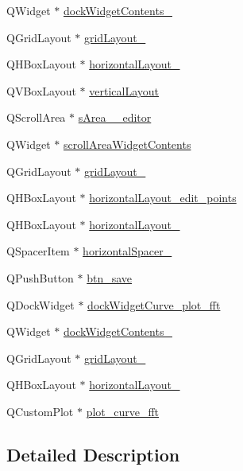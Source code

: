 \begin{DoxyCompactItemize}
\item 
Q\+Widget $\ast$ \hyperlink{a00026_a20ad5110f0fb7b329d067d354f8c9409}{dock\+Widget\+Contents\+\_}
\item 
Q\+Grid\+Layout $\ast$ \hyperlink{a00026_ac56612bd2595405ccbdfe4aae45eccd7}{grid\+Layout\+\_}
\item 
Q\+H\+Box\+Layout $\ast$ \hyperlink{a00026_a42671894c25bd8dfcc6c0a1f8689ecb8}{horizontal\+Layout\+\_}
\item 
Q\+V\+Box\+Layout $\ast$ \hyperlink{a00026_a11b9c1ae90724f0bcd67c76045c93704}{vertical\+Layout}
\item 
Q\+Scroll\+Area $\ast$ \hyperlink{a00026_a6f79b6b1fe81457d76b076a543ee4089}{s\+Area\+\_\+\+\_\+editor}
\item 
Q\+Widget $\ast$ \hyperlink{a00026_a2fd25ae1a2b71980cbe9b9ba2751da3b}{scroll\+Area\+Widget\+Contents}
\item 
Q\+Grid\+Layout $\ast$ \hyperlink{a00026_a8e397832e536976b6717e1d509226b8d}{grid\+Layout\+\_}
\item 
Q\+H\+Box\+Layout $\ast$ \hyperlink{a00026_ae08b661288ecee049945e4a63d0c0af0}{horizontal\+Layout\+\_\+edit\+\_\+points}
\item 
Q\+H\+Box\+Layout $\ast$ \hyperlink{a00026_ade915b192b206af66ce1fb317087ffb6}{horizontal\+Layout\+\_}
\item 
Q\+Spacer\+Item $\ast$ \hyperlink{a00026_a025c1b6f38c90cfa55572934535451a2}{horizontal\+Spacer\+\_}
\item 
Q\+Push\+Button $\ast$ \hyperlink{a00026_a3b0808ff0825375685673655eb4785fc}{btn\+\_\+save}
\item 
Q\+Dock\+Widget $\ast$ \hyperlink{a00026_a7474d72172d9e269e8f3cb22bbe2fc86}{dock\+Widget\+Curve\+\_\+plot\+\_\+fft}
\item 
Q\+Widget $\ast$ \hyperlink{a00026_ae304b249d83cb3152fbbf7a7d7e0e29b}{dock\+Widget\+Contents\+\_}
\item 
Q\+Grid\+Layout $\ast$ \hyperlink{a00026_ab6610272c6c39cba66cab113d98dcdcd}{grid\+Layout\+\_}
\item 
Q\+H\+Box\+Layout $\ast$ \hyperlink{a00026_aaee23fa38e3335cc652ebd35fcdbafc8}{horizontal\+Layout\+\_}
\item 
Q\+Custom\+Plot $\ast$ \hyperlink{a00026_a2bdf46ca3b702151408e6f6bd96b3228}{plot\+\_\+curve\+\_\+fft}
\end{DoxyCompactItemize}


\subsection{Detailed Description}


